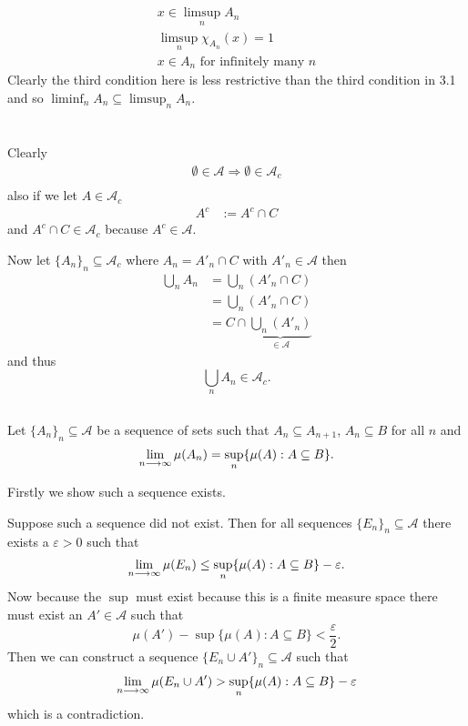 \documentclass{unswmaths}
\begin{document}
\subsection{}

\begin{align*}
    x \in \limsup_{n} A_n \\
    \limsup_{n} \chi_{A_n}(x) = 1\\
    x \in A_n \text{ for infinitely many } n 
\end{align*}
Clearly the third condition here is less restrictive than the third condition in 3.1 and so $ \liminf_n A_n \subseteq \limsup_n A_n $.
\section{}
\subsection{}
Clearly
\begin{align*}
    \emptyset \in \mathcal{A} \Longrightarrow \emptyset \in \mathcal{A}_{c} \\
\end{align*}
also if we let $ A \in \mathcal{A}_{c} $
\begin{align*}
    A^{c} &:= A^{c} \cap C
\end{align*}
and $ A^{c} \cap C \in \mathcal{A}_{c} $ because $ A^{c} \in \mathcal{A} $.

Now let $ \{ A_n \}_n \subseteq \mathcal{A}_{c} $ where $ A_n = A'_n \cap C $ with $ A'_n \in \mathcal{A} $ then 
\begin{align*}
    \bigcup_{n} A_n &= \bigcup_{n} (A'_n \cap C) \\
        &= \bigcup_{n} (A'_n \cap C) \\
        &= C \cap \underbrace{\bigcup_{n} (A'_n)}_{\in \mathcal{A}}
\end{align*}
and thus 
$$
    \bigcup_{n} A_n \in \mathcal{A}_{c}.
$$
\subsection{}
Let $ \{ A_n \}_n \subseteq \mathcal{A} $ be a sequence of sets such that $ A_n \subseteq A_{n+1} $, $ A_n \subseteq B $ for all $ n $ and 
$$ \lim_{n \longrightarrow \infty} \mu(A_n) = \sup_{n} \{ \mu(A) : A \subseteq B \}. $$

Firstly we show such a sequence exists.

Suppose such a sequence did not exist. Then for all sequences $ \{E_n\}_n \subseteq \mathcal{A} $ there exists a $ \varepsilon > 0 $ such that
$$ \lim_{n\longrightarrow\infty} \mu(E_n) \leq \sup_n \{ \mu(A) : A \subseteq B \} - \varepsilon. $$ 
Now because the $ \sup $ must exist because this is a finite measure space there must exist an $ A' \in \mathcal{A} $ such that
$$ \mu(A') - \sup\{ \mu(A) : A \subseteq B \} < \frac{\varepsilon}{2}. $$ Then we can construct a sequence $ \{ E_n \cup A' \}_n \subseteq \mathcal{A} $ such that
$$
    \lim_{n\longrightarrow\infty} \mu(E_n \cup A') >  \sup_{n} \{ \mu(A) : A \subseteq B \} - \varepsilon
$$
which is a contradiction.
\end{document}
